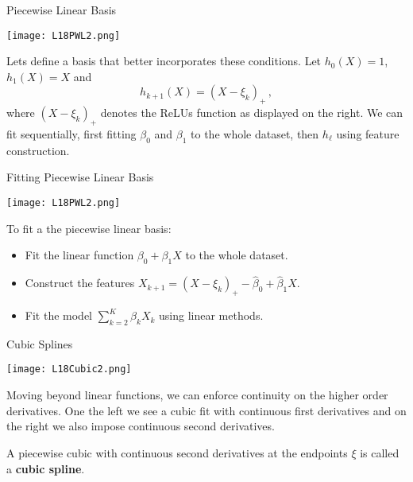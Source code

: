 \documentclass[10pt, table, dvipsnames,xcdraw,handout]{beamer}
\begin{document}
\begin{frame}[fragile]{Piecewise Linear Basis}
  \begin{minipage}[t][0.5\textheight][t]{\textwidth}
	\centering \texttt{[image: L18PWL2.png]} 
  \end{minipage}
  \vfill
\begin{minipage}[t][0.5\textheight][t]{\textwidth}
Lets define a basis that better incorporates these conditions. Let $h_0(X) = 1$, $h_1(X) = X$ and 
$$
h_{k+1}(X) = (X - \xi_k)_+\,,
$$\pause
where $(X - \xi_k)_+$ denotes the ReLUs function as displayed on the right. \pause We can fit sequentially, first fitting $\beta_0$ and $\beta_1$ to the whole dataset, then $h_\ell$ using feature construction. 
\end{minipage}
\end{frame}




\begin{frame}[fragile]{Fitting Piecewise Linear Basis}
  \begin{minipage}[t][0.5\textheight][t]{\textwidth}
	\centering \texttt{[image: L18PWL2.png]} 
  \end{minipage}
  \vfill
\begin{minipage}[t][0.5\textheight][t]{\textwidth}
To fit a the piecewise linear basis: 
\begin{itemize}
\item Fit the linear function $\beta_0 + \beta_1 X$ to the whole dataset. \pause
\item Construct the features $X_{k+1} =  (X - \xi_k)_+ - \hat{\beta}_0 + \hat{\beta}_1 X$.\pause
\item Fit the model $\sum_{k=2}^K \beta_k X_{k}$ using linear methods. 
\end{itemize}
\end{minipage}
\end{frame}








\begin{frame}[fragile]{Cubic Splines}
  \begin{minipage}[t][0.5\textheight][t]{\textwidth}
	\centering \texttt{[image: L18Cubic2.png]} 
  \end{minipage}
  \vfill
\begin{minipage}[t][0.5\textheight][t]{\textwidth}
Moving beyond linear functions, we can enforce continuity on the higher order derivatives. One the left we see a cubic fit with continuous first derivatives and on the right we also impose continuous second derivatives. \pause\newline

A piecewise cubic with continuous second derivatives at the endpoints $\xi$ is called a \textbf{cubic spline}.
\end{minipage}
\end{frame}
\end{document}
